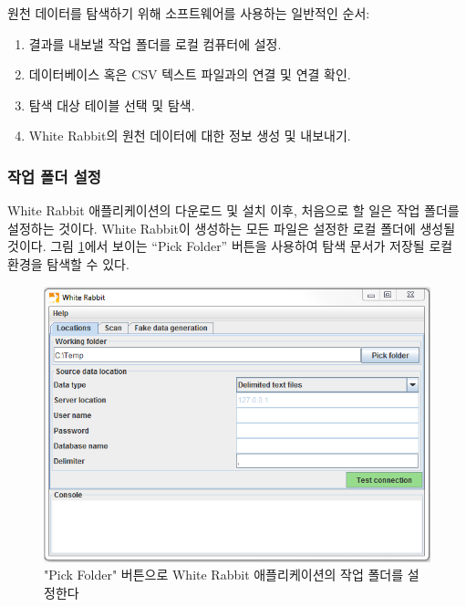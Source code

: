 \documentclass[10.5pt]{book}
\providecommand{\tightlist}{%
  \setlength{\itemsep}{0pt}\setlength{\parskip}{0pt}}
\theoremstyle{definition}
\theoremstyle{definition}
\theoremstyle{definition}
\theoremstyle{remark}
\begin{document}
원천 데이터를 탐색하기 위해 소프트웨어를 사용하는 일반적인 순서:

\begin{enumerate}
\def\labelenumi{\arabic{enumi}.}
\tightlist
\item
  결과를 내보낼 작업 폴더를 로컬 컴퓨터에 설정.
\item
  데이터베이스 혹은 CSV 텍스트 파일과의 연결 및 연결 확인.
\item
  탐색 대상 테이블 선택 및 탐색.
\item
  White Rabbit의 원천 데이터에 대한 정보 생성 및 내보내기.
\end{enumerate}

\subsubsection*{작업 폴더 설정}\label{--}

White Rabbit 애플리케이션의 다운로드 및 설치 이후, 처음으로 할 일은 작업
폴더를 설정하는 것이다. White Rabbit이 생성하는 모든 파일은 설정한 로컬
폴더에 생성될 것이다. 그림 \ref{fig:WhiteRabbitLocation}에서 보이는
``Pick Folder'' 버튼을 사용하여 탐색 문서가 저장될 로컬 환경을 탐색할 수
있다.

\begin{figure}

{\centering \includegraphics[width=1\linewidth]{images/ExtractTransformLoad/WhiteRabbitLocation} 

}

\caption{"Pick Folder" 버튼으로 White Rabbit 애플리케이션의 작업 폴더를 설정한다}\label{fig:WhiteRabbitLocation}
\end{figure}
\end{document}

